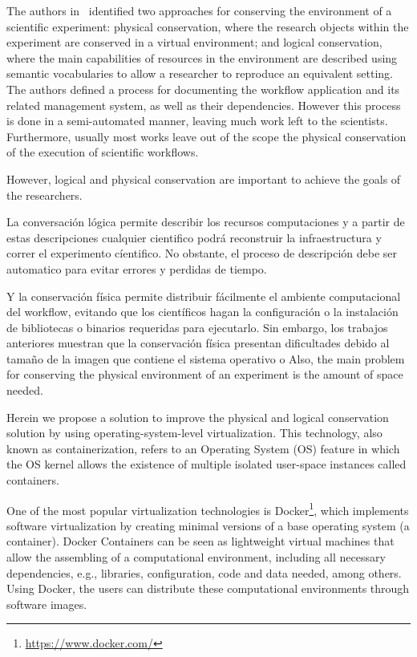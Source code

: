 The authors in~\cite{santana2017reproducibility} identified two approaches for conserving the environment of a scientific experiment: physical conservation, where the research objects within the experiment are conserved in a virtual environment; and logical conservation, where the main capabilities of resources in the environment are described using semantic vocabularies to allow a researcher to reproduce an equivalent setting. The authors defined a process for documenting the workflow application and its related management system, as well as their dependencies. However this process is done in a semi-automated manner, leaving much work left to the scientists. Furthermore, usually most works leave out of the scope the physical conservation of the execution of scientific workflows. 

However, logical and physical conservation are important to achieve the goals of the researchers.

La conversación lógica permite describir los recursos computaciones y a partir de estas descripciones cualquier cientifico podrá reconstruir la infraestructura y correr el experimento cíentifico. No obstante, el proceso de descripción debe ser automatico para evitar errores y perdidas de tiempo.


Y la conservación física permite distribuir fácilmente el ambiente computacional del workflow, evitando que los científicos hagan la configuración o la instalación de bibliotecas o binarios requeridas para ejecutarlo. Sin embargo, los trabajos anteriores muestran que la conservación física presentan dificultades debido al tamaño de la imagen que contiene el sistema operativo o 
Also, the main problem for conserving the physical environment of an experiment is the amount of space needed.



Herein we propose a solution to improve the physical and logical conservation solution by using operating-system-level virtualization. This technology, also known as containerization, refers to an Operating System (OS) feature in which the OS kernel allows the existence of multiple isolated user-space instances called containers. 

One of the most popular virtualization technologies is Docker\footnote{\url{https://www.docker.com/}}, which implements software virtualization by creating minimal versions of a base operating system (a container). 
Docker Containers can be seen as lightweight virtual machines that allow the assembling of a computational environment, including all necessary dependencies, e.g., libraries, configuration, code and data needed, among others. 
Using Docker, the users can distribute these computational environments through software images. 


